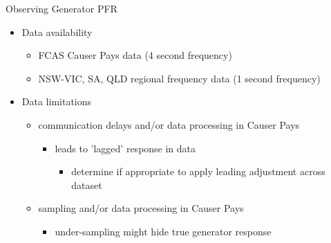 \begin{frame}{Observing Generator PFR}

  \begin{itemize}
    \item Data availability
    \begin{itemize}
        \item FCAS Causer Pays data (4 second frequency)
        \item NSW-VIC, SA, QLD regional frequency data (1 second frequency)
    \end{itemize}
    \item Data limitations
    \begin{itemize}
        \item communication delays and/or data processing in Causer Pays
            \begin{itemize}
                \item leads to 'lagged' response in data
                \begin{itemize}
                    \item determine if appropriate to apply leading adjustment across dataset
                \end{itemize}
            \end{itemize}
        \item sampling and/or data processing in Causer Pays
            \begin{itemize}
                \item under-sampling might hide true generator response
            \end{itemize}
    \end{itemize}
  \end{itemize}
\end{frame}